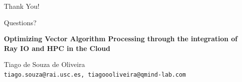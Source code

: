 \documentclass[aspectratio=169]{beamer}
\begin{document}
\begin{frame}[plain]
    \begin{center}
        \Huge Thank You!
        
        \vspace{1cm}
        \Large Questions?
        
        \vspace{0.8cm}
        \normalsize
        \textbf{Optimizing Vector Algorithm Processing through the integration of Ray IO and HPC in the Cloud}
        
        \vspace{0.5cm}
        Tiago de Souza de Oliveira \\
        \texttt{tiago.souza@rai.usc.es, tiagoooliveira@qmind-lab.com}
    \end{center}
\end{frame}
\end{document}
